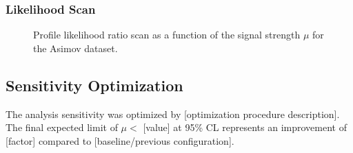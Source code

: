 \subsubsection{Likelihood Scan}


\begin{figure}[htbp]
  \centering
  \caption{Profile likelihood ratio scan as a function of the signal
           strength $\mu$ for the Asimov dataset.}
  \label{fig:likelihood_scan}
\end{figure}

\subsection{Sensitivity Optimization}
\label{sec:expected:optimization}


The analysis sensitivity was optimized by [optimization procedure description].
The final expected limit of $\mu < $ [value] at 95\% CL represents an
improvement of [factor] compared to [baseline/previous configuration].
